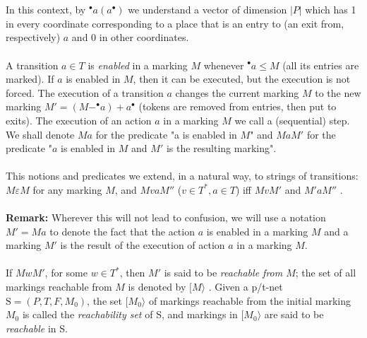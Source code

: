 \documentclass[a4paper]{llncs}
\begin{document}
\\ \\
In this context, by $^\bullet a (a^\bullet)$ we understand a vector of dimension $|P|$ which has 1 in every coordinate corresponding to a place that is an entry to (an exit from, respectively) $a$ and 0 in other coordinates.
\\ \\
A transition $a \in T$ is \emph{enabled} in a marking $M$ whenever $^\bullet a\leq M$ (all its entries are marked). If $a$ is enabled in $M$, then it can be executed, but the execution is not forced. The execution of a transition $a$ changes the current marking $M$ to the new marking $M'=(M-^\bullet a)+a^\bullet $ (tokens are removed from entries, then put to exits). The execution of an action $a$ in a marking $M$ we call a (sequential) step. We shall denote $Ma$ for the predicate "a is enabled in $M$" and $MaM'$ for the predicate "$a$ is enabled in $M$ and $M'$ is the resulting marking".
\\ \\
This notions and predicates we extend, in a natural way, to strings of transitions: $M\varepsilon M$ for any marking $M$, and $MvaM''$  ($v \in T^*, a \in T$) iff $MvM'$ and $M'aM''$ .
\\ \\
\textbf{Remark:} Wherever this will not lead to confusion, we will use a notation $M'=Ma$ to denote the fact that the action $a$ is enabled in a marking $M$ and a marking $M'$ is the result of the execution of action $a$ in a marking $M$.
\\ \\
If $MwM'$, for some $w \in T^*$, then $M'$ is said to be \emph{reachable from $M$}; the set of all markings reachable from $M$ is denoted by $[M\rangle$ . Given a p/t-net $\mathrm{S}=(P,T,F,M_0)$, the set $[M_0\rangle$ of markings reachable from the initial marking $M_0$ is called the \emph{reachability set} of S, and markings in $[M_0\rangle$  are said to be \emph{reachable} in S.
\end{document}
